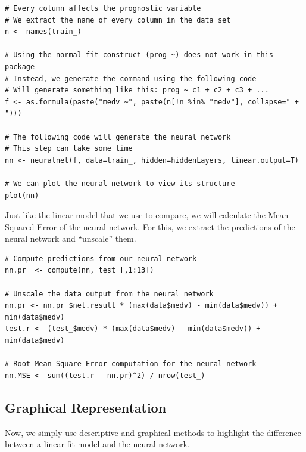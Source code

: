 \begin{lstlisting}
# Every column affects the prognostic variable
# We extract the name of every column in the data set
n <- names(train_)

# Using the normal fit construct (prog ~) does not work in this package
# Instead, we generate the command using the following code
# Will generate something like this: prog ~ c1 + c2 + c3 + ...
f <- as.formula(paste("medv ~", paste(n[!n %in% "medv"], collapse=" + ")))

# The following code will generate the neural network
# This step can take some time
nn <- neuralnet(f, data=train_, hidden=hiddenLayers, linear.output=T)

# We can plot the neural network to view its structure
plot(nn)
\end{lstlisting}

Just like the linear model that we use to compare, we will calculate the Mean-Squared Error of the neural network.
For this, we extract the predictions of the neural network and ``unscale'' them. 

\begin{lstlisting}
# Compute predictions from our neural network
nn.pr_ <- compute(nn, test_[,1:13])

# Unscale the data output from the neural network
nn.pr <- nn.pr_$net.result * (max(data$medv) - min(data$medv)) + min(data$medv)
test.r <- (test_$medv) * (max(data$medv) - min(data$medv)) + min(data$medv)

# Root Mean Square Error computation for the neural network
nn.MSE <- sum((test.r - nn.pr)^2) / nrow(test_)
\end{lstlisting}

\subsection{Graphical Representation}

Now, we simply use descriptive and graphical methods to highlight the difference between a linear fit model and the neural network.

